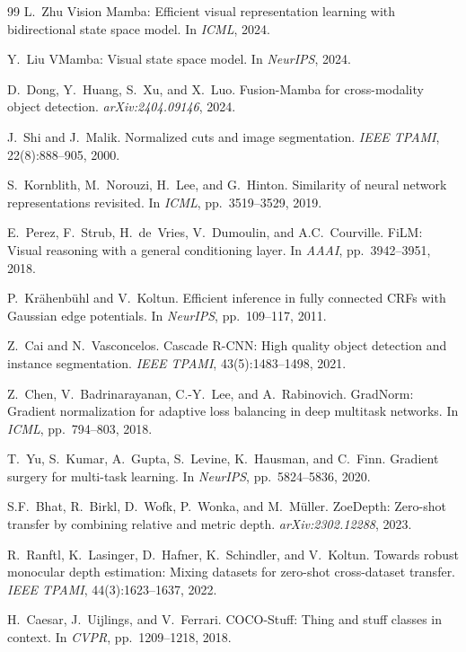 \documentclass[10pt,twocolumn,letterpaper]{article}
\begin{document}
{\begin{thebibliography}{99}
L.~Zhu \etal
Vision {M}amba: Efficient visual representation learning with bidirectional state space model.
In \emph{ICML}, 2024.

Y.~Liu \etal
{VMamba}: Visual state space model.
In \emph{NeurIPS}, 2024.

D.~Dong, Y.~Huang, S.~Xu, and X.~Luo.
Fusion-{M}amba for cross-modality object detection.
\emph{arXiv:2404.09146}, 2024.

J.~Shi and J.~Malik.
Normalized cuts and image segmentation.
\emph{IEEE TPAMI}, 22(8):888--905, 2000.

S.~Kornblith, M.~Norouzi, H.~Lee, and G.~Hinton.
Similarity of neural network representations revisited.
In \emph{ICML}, pp.~3519--3529, 2019.

E.~Perez, F.~Strub, H.~de~Vries, V.~Dumoulin, and A.C.~Courville.
{FiLM}: Visual reasoning with a general conditioning layer.
In \emph{AAAI}, pp.~3942--3951, 2018.

P.~Kr{\"a}henb{\"u}hl and V.~Koltun.
Efficient inference in fully connected {CRFs} with {G}aussian edge potentials.
In \emph{NeurIPS}, pp.~109--117, 2011.

Z.~Cai and N.~Vasconcelos.
Cascade {R-CNN}: High quality object detection and instance segmentation.
\emph{IEEE TPAMI}, 43(5):1483--1498, 2021.

Z.~Chen, V.~Badrinarayanan, C.-Y.~Lee, and A.~Rabinovich.
{GradNorm}: Gradient normalization for adaptive loss balancing in deep multitask networks.
In \emph{ICML}, pp.~794--803, 2018.

T.~Yu, S.~Kumar, A.~Gupta, S.~Levine, K.~Hausman, and C.~Finn.
Gradient surgery for multi-task learning.
In \emph{NeurIPS}, pp.~5824--5836, 2020.

S.F.~Bhat, R.~Birkl, D.~Wofk, P.~Wonka, and M.~M{\"u}ller.
{ZoeDepth}: Zero-shot transfer by combining relative and metric depth.
\emph{arXiv:2302.12288}, 2023.

R.~Ranftl, K.~Lasinger, D.~Hafner, K.~Schindler, and V.~Koltun.
Towards robust monocular depth estimation: Mixing datasets for zero-shot cross-dataset transfer.
\emph{IEEE TPAMI}, 44(3):1623--1637, 2022.

H.~Caesar, J.~Uijlings, and V.~Ferrari.
{COCO-Stuff}: Thing and stuff classes in context.
In \emph{CVPR}, pp.~1209--1218, 2018.


\end{thebibliography}}
\end{document}
